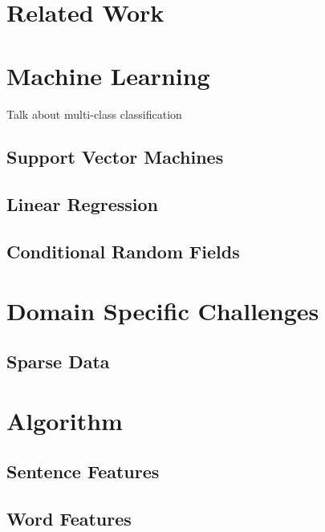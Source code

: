\documentclass[preprint]{style}
\begin{document}
\section{Related Work}

\vspace{1in}



\section{Machine Learning}

Talk about multi-class classification

\subsection{Support Vector Machines}

\subsection{Linear Regression}

\subsection{Conditional Random Fields}

\vspace{1in}



\section{Domain Specific Challenges}

\subsection{Sparse Data}

\vspace{1in}



\section{Algorithm}

\subsection{Sentence Features}

\subsection{Word Features}
\end{document}
